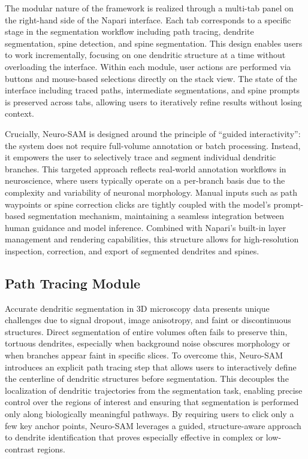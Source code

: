The modular nature of the framework is realized through a multi-tab panel on the right-hand side of the Napari interface. Each tab corresponds to a specific stage in the segmentation workflow including path tracing, dendrite segmentation, spine detection, and spine segmentation. This design enables users to work incrementally, focusing on one dendritic structure at a time without overloading the interface. Within each module, user actions are performed via buttons and mouse-based selections directly on the stack view. The state of the interface including traced paths, intermediate segmentations, and spine prompts is preserved across tabs, allowing users to iteratively refine results without losing context.

Crucially, Neuro-\gls{SAM} is designed around the principle of “guided interactivity”: the system does not require full-volume annotation or batch processing. Instead, it empowers the user to selectively trace and segment individual dendritic branches. This targeted approach reflects real-world annotation workflows in neuroscience, where users typically operate on a per-branch basis due to the complexity and variability of neuronal morphology. Manual inputs such as path waypoints or spine correction clicks are tightly coupled with the model’s prompt-based segmentation mechanism, maintaining a seamless integration between human guidance and model inference. Combined with Napari’s built-in layer management and rendering capabilities, this structure allows for high-resolution inspection, correction, and export of segmented dendrites and spines.

\subsection{Path Tracing Module}
Accurate dendritic segmentation in 3D microscopy data presents unique challenges due to signal dropout, image anisotropy, and faint or discontinuous structures. Direct segmentation of entire volumes often fails to preserve thin, tortuous dendrites, especially when background noise obscures morphology or when branches appear faint in specific slices. To overcome this, Neuro-\gls{SAM} introduces an explicit path tracing step that allows users to interactively define the centerline of dendritic structures before segmentation. This decouples the localization of dendritic trajectories from the segmentation task, enabling precise control over the regions of interest and ensuring that segmentation is performed only along biologically meaningful pathways. By requiring users to click only a few key anchor points, Neuro-\gls{SAM} leverages a guided, structure-aware approach to dendrite identification that proves especially effective in complex or low-contrast regions.

